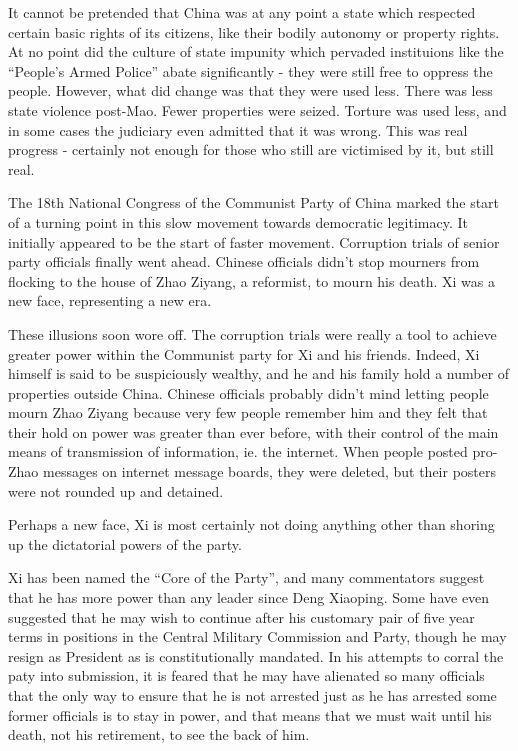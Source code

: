 \documentclass[11pt,a4paper]{report}
\begin{document}
\begin{multicols}{2}
It cannot be pretended that China was at any point a state which respected certain basic rights of its citizens, like their bodily autonomy or property rights. At no point did the culture of state impunity which pervaded instituions like the ``People's Armed Police'' abate significantly - they were still free to oppress the people. However, what did change was that they were used less. There was less state violence post-Mao. Fewer properties were seized. Torture was used less, and in some cases the judiciary even admitted that it was wrong. This was real progress - certainly not enough for those who still are victimised by it, but still real.

The 18th National Congress of the Communist Party of China marked the start of a turning point in this slow movement towards democratic legitimacy. It initially appeared to be the start of faster movement. Corruption trials of senior party officials finally went ahead. Chinese officials didn't stop mourners from flocking to the house of Zhao Ziyang, a reformist, to mourn his death. Xi was a new face, representing a new era.

These illusions soon wore off. The corruption trials were really a tool to achieve greater power within the Communist party for Xi and his friends. Indeed, Xi himself is said to be suspiciously wealthy, and he and his family hold a number of properties outside China. Chinese officials probably didn't mind letting people mourn Zhao Ziyang because very few people remember him and they felt that their hold on power was greater than ever before, with their control of the main means of transmission of information, ie. the internet. When people posted pro-Zhao messages on internet message boards, they were deleted, but their posters were not rounded up and detained.

Perhaps a new face, Xi is most certainly not doing anything other than shoring up the dictatorial powers of the party.

Xi has been named the ``Core of the Party'', and many commentators suggest that he has more power than any leader since Deng Xiaoping. Some have even suggested that he may wish to continue after his customary pair of five year terms in positions in the Central Military Commission and Party, though he may resign as President as is constitutionally mandated. In his attempts to corral the paty into submission, it is feared that he may have alienated so many officials that the only way to ensure that he is not arrested just as he has arrested some former officials is to stay in power, and that means that we must wait until his death, not his retirement, to see the back of him.


\end{multicols}
\end{document}
